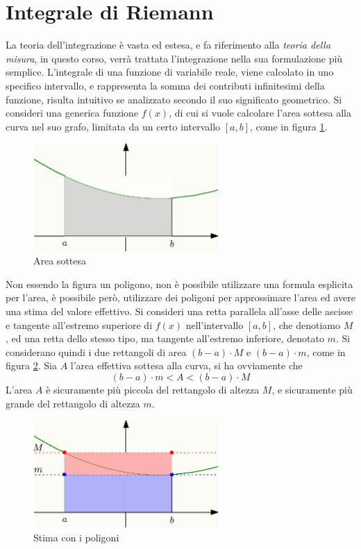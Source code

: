 \documentclass[10pt, letterpaper]{report}
\begin{document}
\section{Integrale di Riemann}
La teoria dell'integrazione è vasta ed estesa, e fa riferimento alla
\textit{teoria della misura}, in questo corso, verrà trattata l'integrazione
nella sua formulazione più semplice.\acc
L'integrale di una funzione di variabile reale, viene calcolato
in uno specifico intervallo, e rappresenta la somma dei contributi
infinitesimi della funzione, risulta intuitivo se analizzato secondo
il suo significato geometrico.\acc
Si consideri una generica funzione $f(x)$, di cui si vuole calcolare
l'area sottesa alla curva nel suo grafo, limitata da un certo
intervallo $[a,b]$, come in figura \ref{fig:int1}.\begin{figure}[h!]
    \centering
    \includegraphics[width=200pt ]{images/integrale1.eps}
    \caption{Area sottesa}
    \label{fig:int1}
\end{figure}
Non essendo la figura un poligono, non è possibile utilizzare una
formula esplicita per l'area, è possibile però, utilizzare dei poligoni
per approssimare l'area ed avere una stima del valore effettivo.\acc
Si consideri una retta parallela all'asse delle ascisse e tangente
all'estremo superiore di $f(x)$ nell'intervallo $[a,b]$, che
denotiamo $M$, ed una retta
dello stesso tipo, ma tangente all'estremo inferiore, denotato $m$.
Si considerano quindi i due rettangoli di area $(b-a)\cdot M$ e
$(b-a)\cdot m$, come in figura \ref{fig:int2}.
Sia $A$ l'area effettiva sottesa alla curva, si ha
ovviamente che
$$ (b-a)\cdot m <A<(b-a)\cdot M$$
L'area $A$ è sicuramente più piccola del rettangolo di altezza $M$, e
sicuramente più grande del rettangolo di altezza $m$.
\begin{figure}[h!]
    \centering
    \includegraphics[width=200pt ]{images/integrale2.eps}
    \caption{Stima con i poligoni}
    \label{fig:int2}
\end{figure}
\end{document}
